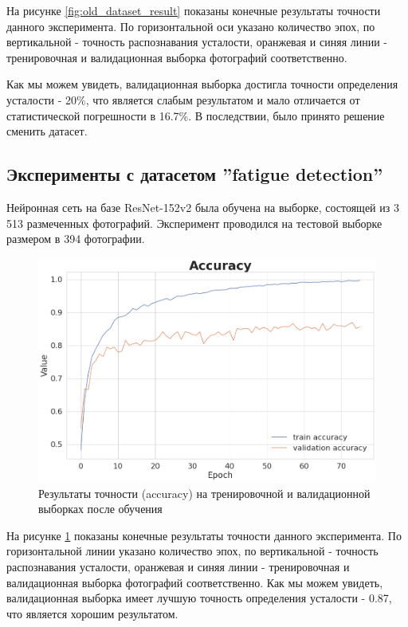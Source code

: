 \documentclass[12pt, letterpaper]{article}
\begin{document}
    На рисунке \ref{fig:old_dataset_result} показаны конечные результаты точности данного эксперимента. По горизонтальной оси указано количество эпох, по вертикальной - точность распознавания усталости, оранжевая и синяя линии - тренировочная и валидационная выборка фотографий соответственно.
    
    Как мы можем увидеть, валидационная выборка достигла точности определения усталости - 20\%, что является слабым результатом и мало отличается от статистической погрешности в 16.7\%. В последствии, было принято решение сменить датасет.
    
    
\subsection{Эксперименты с датасетом ''fatigue detection''}
    
    Нейронная сеть на базе ResNet-152v2 была обучена на выборке, состоящей из 3 513 размеченных фотографий. Эксперимент проводился на тестовой выборке размером в 394 фотографии.

    \begin{figure}[H]
        \centering
        \includegraphics[width=1\linewidth]{accuracy.png}
        \caption{Результаты точности (accuracy) на тренировочной и валидационной выборках после обучения}
        \label{fig:accuracy}
    \end{figure}
    
    На рисунке \ref{fig:accuracy} показаны конечные результаты точности данного эксперимента. По горизонтальной линии указано количество эпох, по вертикальной - точность распознавания усталости, оранжевая и синяя линии - тренировочная и валидационная выборка фотографий соответственно. Как мы можем увидеть, валидационная выборка имеет лучшую точность определения усталости - 0.87, что является хорошим результатом.
    
\end{document}
